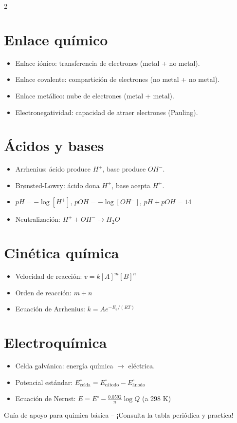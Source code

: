 \documentclass[12pt]{article}
\begin{document}
\begin{multicols}{2}
\section*{Enlace químico}
\begin{itemize}[leftmargin=*]
    \item Enlace iónico: transferencia de electrones (metal + no metal).
    \item Enlace covalente: compartición de electrones (no metal + no metal).
    \item Enlace metálico: nube de electrones (metal + metal).
    \item Electronegatividad: capacidad de atraer electrones (Pauling).
\end{itemize}

\section*{Ácidos y bases}
\begin{itemize}[leftmargin=*]
    \item Arrhenius: ácido produce $H^+$, base produce $OH^-$.
    \item Brønsted-Lowry: ácido dona $H^+$, base acepta $H^+$.
    \item $pH = -\log[H^+]$, $pOH = -\log[OH^-]$, $pH + pOH = 14$
    \item Neutralización: $H^+ + OH^- \rightarrow H_2O$
\end{itemize}

\section*{Cinética química}
\begin{itemize}[leftmargin=*]
    \item Velocidad de reacción: $v = k[A]^m[B]^n$
    \item Orden de reacción: $m+n$
    \item Ecuación de Arrhenius: $k = A e^{-E_a/(RT)}$
\end{itemize}

\section*{Electroquímica}
\begin{itemize}[leftmargin=*]
    \item Celda galvánica: energía química $\rightarrow$ eléctrica.
    \item Potencial estándar: $E^\circ_{\text{celda}} = E^\circ_{\text{cátodo}} - E^\circ_{\text{ánodo}}$
    \item Ecuación de Nernst: $E = E^\circ - \frac{0.0592}{n} \log Q$ (a 298 K)
\end{itemize}

\end{multicols}

\vfill
\begin{center}
\small{Guía de apoyo para química básica -- ¡Consulta la tabla periódica y practica!}
\end{center}
\end{document}
